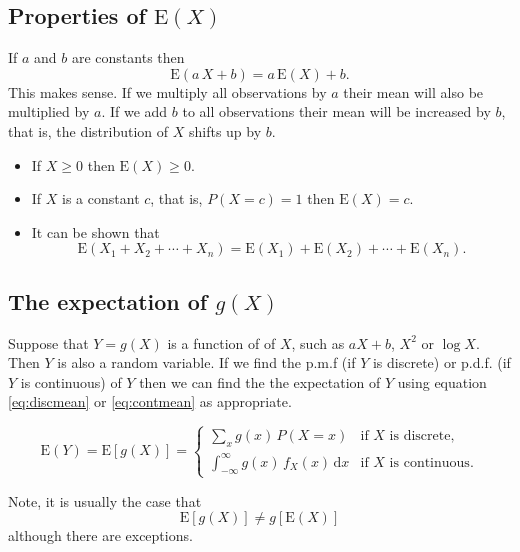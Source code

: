 \documentclass[
  british,
]{book}
\providecommand{\tightlist}{%
  \setlength{\itemsep}{0pt}\setlength{\parskip}{0pt}}
\begin{document}
\hypertarget{properties-of-mathrmex}{%
\subsection{\texorpdfstring{Properties of \(\mathrm{E}(X)\)}{Properties of \textbackslash mathrm\{E\}(X)}}\label{properties-of-mathrmex}}

If \(a\) and \(b\) are constants then
\[ \mathrm{E}(a\,X+b) = a\,\mathrm{E}(X)+b. \]
This makes sense. If we multiply all observations by \(a\) their mean will also be multiplied by \(a\). If we add \(b\) to all observations their mean will be increased by \(b\), that is, the distribution of \(X\) shifts up by \(b\).

\begin{itemize}
\tightlist
\item
  If \(X \geq 0\) then \(\mathrm{E}(X) \geq 0\).
\item
  If \(X\) is a constant \(c\), that is, \(P(X=c)=1\) then \(\mathrm{E}(X)=c\).
\item
  It can be shown that
  \[ \mathrm{E}(X_1 + X_2 + \cdots + X_n) = \mathrm{E}(X_1) + \mathrm{E}(X_2) + \cdots + \mathrm{E}(X_n). \]
\end{itemize}

\hypertarget{the-expectation-of-gx}{%
\subsection{\texorpdfstring{The expectation of \(g(X)\)}{The expectation of g(X)}}\label{the-expectation-of-gx}}

Suppose that \(Y=g(X)\) is a function of of \(X\), such as \(aX+b\), \(X^2\) or \(\log X\). Then \(Y\) is also a random variable. If we find the p.m.f (if \(Y\) is discrete) or p.d.f. (if \(Y\) is continuous) of \(Y\) then we can find the the expectation of \(Y\) using equation \eqref{eq:discmean} or \eqref{eq:contmean} as appropriate.

\begin{equation}
\mathrm{E}(Y) = \mathrm{E}[g(X)] =
\begin{cases} 
\displaystyle\sum_x g(x)\,P(X=x) & \text{if } X \text{ is discrete}, \\
\int_{-\infty}^{\infty} g(x)\,f_X(x) \,\mathrm{d}x & \text{if } X \text{ is continuous}.
\end{cases}
\label{eq:expfn}
\end{equation}

Note, it is usually the case that
\[ \mathrm{E}[g(X)] \neq g[\mathrm{E}(X)] \]
although there are exceptions.
\end{document}
